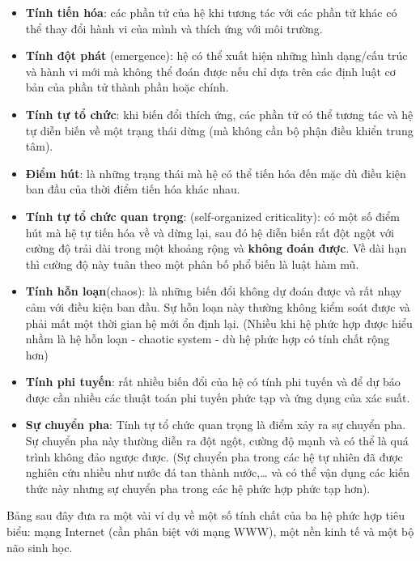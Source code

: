 \documentclass[]{book}
\begin{document}
\begin{itemize}
\item
  \textbf{Tính tiến hóa}: các phần tử của hệ khi tương tác với các phần
  tử khác có thể thay đổi hành vi của mình và thích ứng với môi trường.
\item
  \textbf{Tính đột phát} (emergence): hệ có thể xuất hiện những hình
  dạng/cấu trúc và hành vi mới mà không thể đoán được nếu chỉ dựa trên
  các định luật cơ bản của phần tử thành phần hoặc chính.
\item
  \textbf{Tính tự tổ chức}: khi biến đổi thích ứng, các phần tử có thể
  tương tác và hệ tự diễn biến về một trạng thái dừng (mà không cần bộ
  phận điều khiển trung tâm).
\item
  \textbf{Điểm hút}: là những trạng thái mà hệ có thể tiến hóa đến mặc
  dù điều kiện ban đầu của thời điểm tiến hóa khác nhau.
\item
  \textbf{Tính tự tổ chức quan trọng}: (self-organized criticality): có
  một số điểm hút mà hệ tự tiến hóa về và dừng lại, sau đó hệ diễn biến
  rất đột ngột với cường độ trải dài trong một khoảng rộng và
  \textbf{không đoán được}. Về dài hạn thì cường độ này tuân theo một
  phân bố phổ biến là luật hàm mũ.
\item
  \textbf{Tính hỗn loạn}(chaos): là những biến đổi không dự đoán được và
  rất nhạy cảm với điều kiện ban đầu. Sự hỗn loạn này thường không kiểm
  soát được và phải mất một thời gian hệ mới ổn định lại. (Nhiều khi hệ
  phức hợp được hiểu nhầm là hệ hỗn loạn - chaotic system - dù hệ phức
  hợp có tính chất rộng hơn)
\item
  \textbf{Tính phi tuyến}: rất nhiều biến đổi của hệ có tính phi tuyến
  và để dự báo được cần nhiều các thuật toán phi tuyến phức tạp và ứng
  dụng của xác suất.
\item
  \textbf{Sự chuyển pha}: Tính tự tổ chức quan trọng là điểm xảy ra sự
  chuyển pha. Sự chuyển pha này thường diễn ra đột ngột, cường độ mạnh
  và có thể là quá trình không đảo ngược được. (Sự chuyển pha trong các
  hệ tự nhiên đã được nghiên cứu nhiều như nước đá tan thành
  nước,\ldots{} và có thể vận dụng các kiến thức này nhưng sự chuyển pha
  trong các hệ phức hợp phức tạp hơn).
\end{itemize}

Bảng sau đây đưa ra một vài ví dụ về một số tính chất của ba hệ phức hợp
tiêu biểu: mạng Internet (cần phân biệt với mạng WWW), một nền kinh tế
và một bộ não sinh học.
\end{document}

